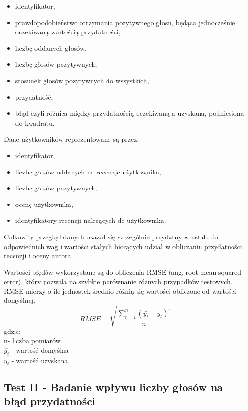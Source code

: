 \begin{itemize}
\item identyfikator,
\item prawdopodobieństwo otrzymania pozytywnego głosu, będąca jednocześnie oczekiwaną wartością przydatności,
\item liczbę oddanych głosów,
\item liczbę głosów pozytywnych,
\item stosunek głosów pozytywnych do wszystkich,
\item przydatność,
\item błąd czyli różnica między przydatnością oczekiwaną a uzyskaną, podniesiona do kwadratu.
\end{itemize}

Dane użytkowników reprezentowane są przez:

\begin{itemize}
\item identyfikator,
\item liczbę głosów oddanych na recenzje użytkownika,
\item liczbę głosów pozytywnych,
\item ocenę użytkownika,
\item identyfikatory recenzji należących do użytkownika.
\end{itemize}

Całkowity przegląd danych okazał się szczególnie przydatny w ustalaniu odpowiednich wag i wartości stałych biorących udział w obliczaniu przydatności recenzji i oceny autora.

Wartości błędów wykorzystane są do obliczenia RMSE (ang. root mean squared error), który pozwala na szybkie porównanie różnych przypadków testowych. RMSE mierzy o ile jednostek średnio różnią się wartości obliczone od wartości domyślnej.\cite{rmseWiki}\\
\begin{equation}
RMSE=\sqrt{\frac{\sum_{t=1}^n (\bar{y_{t}}-y_{t})^2}{n}}
\end{equation}
gdzie:\\
n- liczba pomiarów\\
$\bar{y_{t}}$ - wartość domyślna\\
$y_{t}$ - wartość uzyskana\\

\subsection{Test II - Badanie wpływu liczby głosów na błąd przydatności}

